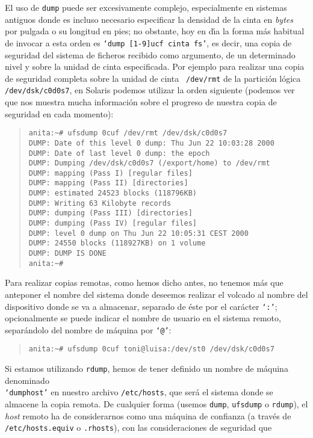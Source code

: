 El uso de {\tt dump} puede ser excesivamente complejo, especialmente en sistemas
antiguos donde es incluso necesario especificar la densidad de la cinta en
{\it bytes} por pulgada o su longitud en pies; no obstante, hoy en d\'{\i}a la 
forma m\'as habitual
de invocar a esta orden es {\tt `dump [1-9]ucf cinta fs'}, es decir, una
copia de seguridad del sistema de ficheros recibido como argumento, de un 
determinado nivel y sobre la unidad de cinta especificada. Por ejemplo para
realizar una copia de seguridad completa sobre la unidad de cinta {\tt 
/dev/rmt} de la partici\'on l\'ogica {\tt /dev/dsk/c0d0s7}, en Solaris podemos
utilizar la orden siguiente (podemos ver que nos muestra mucha informaci\'on
sobre el progreso de nuestra copia de seguridad en cada momento):
\begin{quote}
\begin{verbatim}
anita:~# ufsdump 0cuf /dev/rmt /dev/dsk/c0d0s7
DUMP: Date of this level 0 dump: Thu Jun 22 10:03:28 2000
DUMP: Date of last level 0 dump: the epoch
DUMP: Dumping /dev/dsk/c0d0s7 (/export/home) to /dev/rmt
DUMP: mapping (Pass I) [regular files]
DUMP: mapping (Pass II) [directories]
DUMP: estimated 24523 blocks (118796KB)
DUMP: Writing 63 Kilobyte records
DUMP: dumping (Pass III) [directories]
DUMP: dumping (Pass IV) [regular files]
DUMP: level 0 dump on Thu Jun 22 10:05:31 CEST 2000
DUMP: 24550 blocks (118927KB) on 1 volume
DUMP: DUMP IS DONE
anita:~#
\end{verbatim}
\end{quote}
Para realizar copias remotas, como hemos dicho antes, no tenemos m\'as que
anteponer el nombre del sistema donde deseemos realizar el volcado al nombre
del dispositivo donde se va a almacenar, separado de \'este por el car\'acter
{\tt `:'}; opcionalmente se puede indicar el nombre de usuario en el sistema
remoto, separ\'andolo del nombre de m\'aquina por {\tt `@'}:
\begin{quote}
\begin{verbatim}
anita:~# ufsdump 0cuf toni@luisa:/dev/st0 /dev/dsk/c0d0s7
\end{verbatim}
\end{quote}
Si estamos utilizando {\tt rdump}, hemos de tener definido un nombre de 
m\'aquina denominado {\tt \\`dumphost'} en nuestro archivo {\tt /etc/hosts}, que
ser\'a el sistema donde se almacene la copia remota. De cualquier forma (usemos
{\tt dump}, {\tt ufsdump} o {\tt rdump}), el {\it host} remoto ha de 
considerarnos como una m\'aquina de confianza (a trav\'es de {\tt 
/etc/hosts.equiv} o {\tt .rhosts}), con las consideraciones de seguridad que 
